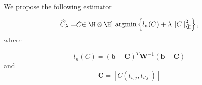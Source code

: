 \begin{frame}
We propose the following estimator
\[
\widehat{C}_{\lambda}=\stackrel[C \in \H\otimes \H]{}{\text{ argmin}} \left\{ l_{n}(C)+\lambda\left\Vert C\right\Vert _{\breve{\H}}^{2} \right\},
\]
 where

\begin{equation}
l_{n}(C)= (\mathbf{b} - \mathbf{C})^T\mathbf{W}^{-1}(\mathbf{b} - \mathbf{C})
\label{eq:weighted loss function}
\end{equation}
and 
\[
\mathbf{C} = [C(t_{i,j}, t_{i'j'})]
\]
\end{frame}
